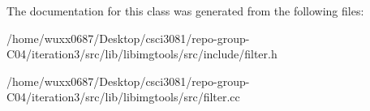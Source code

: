The documentation for this class was generated from the following files\+:\begin{DoxyCompactItemize}
\item 
/home/wuxx0687/\+Desktop/csci3081/repo-\/group-\/\+C04/iteration3/src/lib/libimgtools/src/include/filter.\+h\item 
/home/wuxx0687/\+Desktop/csci3081/repo-\/group-\/\+C04/iteration3/src/lib/libimgtools/src/filter.\+cc\end{DoxyCompactItemize}

